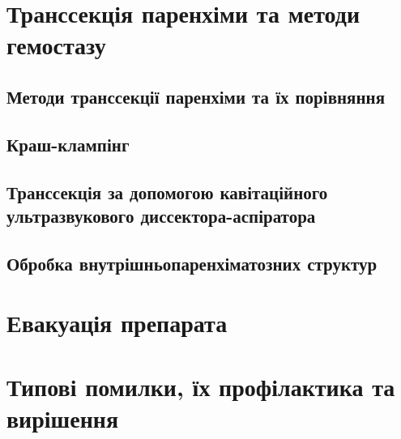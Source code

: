 \begin{refsection}
\section{Транссекція паренхіми та методи гемостазу}

\subsection{Методи транссекції паренхіми та їх порівняння}

\subsection{Краш-клампінг}

\subsection{Транссекція за допомогою кавітаційного ультразвукового диссектора-аспіратора}

\subsection{Обробка внутрішньопаренхіматозних структур}

\section{Евакуація препарата}

\section{Типові помилки, їх профілактика та вирішення}

\printbibliography [heading=subbibliography]
\end{refsection}